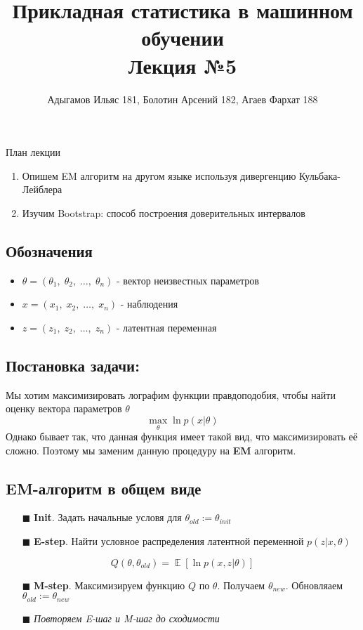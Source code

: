 \documentclass[10pt, a4paper]{extarticle}
\title{{\normalsize Прикладная статистика в машинном обучении} \\\vspace{0.5em} Лекция №5}
\author{Адыгамов Ильяс 181, Болотин Арсений 182, Агаев Фархат 188}
\date{\rule{15cm}{0.4pt}}
\DeclareMathOperator{\E}{\mathbb{E}}
\begin{document}
	
\maketitle
	
\begin{rulesbox}{План лекции}
\begin{enumerate}
	    \item Опишем EM алгоритм на другом языке используя дивергенцию Кульбака-Лейблера
	    \item Изучим Bootstrap: способ построения доверительных интервалов
\end{enumerate}
\end{rulesbox}

\subsection*{\textbf{Обозначения}}
\begin{itemize}
    \item $\theta = (\theta_1, \; \theta_2, \; \dots, \; \theta_n)$ - вектор неизвестных параметров
    \item $x = (x_1,\; x_2,\; \dotsc,\; x_n)$ - наблюдения 
    \item $z = (z_1, \; z_2, \; \dotsc, \; z_n)$ - латентная переменная
\end{itemize}
\subsection*{\textbf{Постановка задачи:}}
Мы хотим максимизировать лографим функции правдоподобия, чтобы найти оценку вектора параметров $\theta$
\[
\max_{\theta} \ln p(x|\theta)
\]
Однако бывает так, что данная функция имеет такой вид, что максимизировать её сложно. 
Поэтому мы заменим данную процедуру на \textbf{EM} алгоритм.
\subsection*{\textbf{EM-алгоритм в общем виде}}
\begin{itemize}
    \item[$\blacksquare$] \textbf{Init}. Задать начальные условя для $\theta_{old} := \theta_{init}$
    \item[$\blacksquare$] \textbf{E-step}. Найти условное распределения латентной переменной $p(z|x, \theta)$
\end{itemize}
\[ Q(\theta, \theta_{old})= \E  [  \ln p (x, z | \theta ) ] \]

\begin{itemize}
    \item[$\blacksquare$] \textbf{M-step}. Максимизируем функцию $Q$ по $\theta$. Получаем $\theta_{new}$. Обновляаем $\theta_{old} := \theta_{new}$
    \item[$\blacksquare$] \textit{Повторяем E-шаг и M-шаг до сходимости}
\end{itemize}
\end{document}
